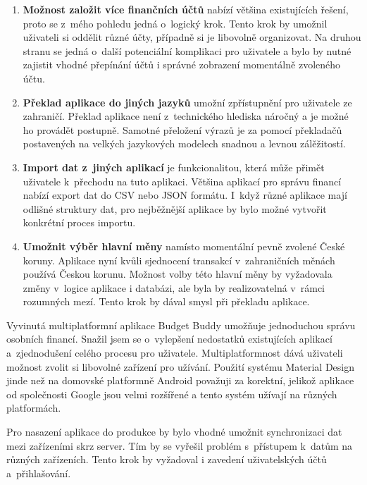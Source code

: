 \documentclass[
  biblatex,
  figures=true,
  tables=false,
  glossaries,
  index
]{kidiplom}
\begin{document}
\begin{enumerate}
  \item \textbf{Možnost založit více finančních účtů} nabízí většina existujících řešení, proto se z~mého pohledu jedná o~logický krok. Tento krok by umožnil uživateli si oddělit různé účty, případně si je libovolně organizovat. Na druhou stranu se jedná o~další potenciální komplikaci pro uživatele a bylo by nutné zajistit vhodné přepínání účtů i správné zobrazení momentálně zvoleného účtu.
  \item \textbf{Překlad aplikace do jiných jazyků} umožní zpřístupnění pro uživatele ze zahraničí. Překlad aplikace není z~technického hlediska náročný a je možné ho provádět postupně. Samotné přeložení výrazů je za pomocí překladačů postavených na velkých jazykových modelech snadnou a levnou zálěžitostí.
  \item \textbf{Import dat z~jiných aplikací} je funkcionalitou, která může přimět uživatele k~přechodu na tuto aplikaci. Většina aplikací pro správu financí nabízí export dat do CSV nebo JSON formátu. I~když různé aplikace mají odlišné struktury dat, pro nejběžnější aplikace by bylo možné vytvořit konkrétní proces importu.
  \item \textbf{Umožnit výběr hlavní měny} namísto momentální pevně zvolené České koruny. Aplikace nyní kvůli sjednocení transakcí v~zahraničních měnách používá Českou korunu. Možnost volby této hlavní měny by vyžadovala změny v~logice aplikace i databázi, ale byla by realizovatelná v~rámci rozumných mezí. Tento krok by dával smysl při překladu aplikace.
\end{enumerate}

\begin{kiconclusions}
Vyvinutá multiplatformní aplikace Budget Buddy umožňuje jednoduchou správu osobních financí. Snažil jsem se o~vylepšení nedostatků existujících aplikací a~zjednodušení celého procesu pro uživatele. Multiplatformnost dává uživateli možnost zvolit si libovolné zařízení pro užívání. Použití systému Material Design jinde než na domovské platformně Android považuji za korektní, jelikož aplikace od společnosti Google jsou velmi rozšířené a tento systém užívají na různých platformách.

Pro nasazení aplikace do produkce by bylo vhodné umožnit synchronizaci dat mezi zařízeními skrz server. Tím by se vyřešil problém s~přístupem k~datům na různých zařízeních. Tento krok by vyžadoval i zavedení uživatelských účtů a~přihlašování.
\end{kiconclusions}
\end{document}
